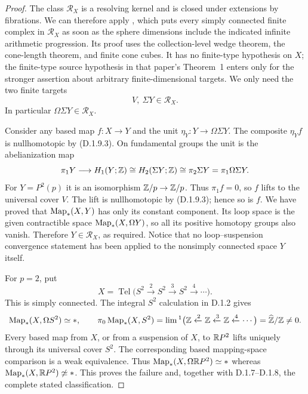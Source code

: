 \begin{proof}
The class $\mathcal R_X$ is a resolving kernel and is closed
under extensions by fibrations. We can therefore apply
\cite[Corollary~12(a), pp.~8--9]{I_Strom2012}, which puts every
simply connected finite complex in $\mathcal R_X$ as soon as
the sphere dimensions include the indicated infinite arithmetic
progression. Its proof uses the collection-level wedge theorem,
the cone-length theorem, and finite cone cubes. It has no
finite-type hypothesis on $X$; the finite-type source hypothesis
in that paper's Theorem~1 enters only for the stronger assertion
about arbitrary finite-dimensional targets. We only need the
two finite targets
\[
                           V,\ \Sigma Y\in\mathcal R_X.
 \tag{D.1.9.3}
\]
In particular $\Omega\Sigma Y\in\mathcal R_X$.

Consider any based map $f:X\to Y$ and the unit
$\eta_Y:Y\to\Omega\Sigma Y$. The composite $\eta_Yf$ is
nullhomotopic by (D.1.9.3). On fundamental groups the unit is
the abelianization map
\[
 \pi_1Y\longrightarrow H_1(Y;\mathbb Z)
     \cong H_2(\Sigma Y;\mathbb Z)
     \cong\pi_2\Sigma Y=\pi_1\Omega\Sigma Y.
\]
For $Y=P^2(p)$ it is an isomorphism $\mathbb Z/p\to\mathbb Z/p$.
Thus $\pi_1f=0$, so $f$ lifts to the universal cover $V$.
The lift is nullhomotopic by (D.1.9.3); hence so is $f$.
We have proved that $\operatorname{Map}_*(X,Y)$ has only its constant
component. Its loop space is the given contractible space
$\operatorname{Map}_*(X,\Omega Y)$, so all its positive homotopy groups
also vanish. Therefore $Y\in\mathcal R_X$, as required.
Notice that no loop--suspension convergence statement has been
applied to the nonsimply connected space $Y$ itself.

For $p=2$, put
\[
 X=\operatorname{Tel}\bigl(S^2\xrightarrow{2}S^2
              \xrightarrow{3}S^2\xrightarrow{4}\cdots\bigr).
\]
This is simply connected. The integral $S^2$ calculation in
D.1.2 gives
\[
 \operatorname{Map}_*(X,\Omega S^2)\simeq *,\qquad
 \pi_0\operatorname{Map}_*(X,S^2)
       =\lim{}^1\bigl(\mathbb Z\xleftarrow{2}\mathbb Z
                      \xleftarrow{3}\mathbb Z\xleftarrow{4}\cdots\bigr)
       =\widehat{\mathbb Z}/\mathbb Z\ne0.
\]
Every based map from $X$, or from a suspension of $X$, to
$\mathbb{R}P^2$ lifts uniquely through its universal cover $S^2$.
The corresponding based mapping-space comparison is a weak
equivalence. Thus
$\operatorname{Map}_*(X,\Omega\mathbb{R}P^2)\simeq *$ whereas
$\operatorname{Map}_*(X,\mathbb{R}P^2)\not\simeq *$. This proves the failure and,
together with D.1.7--D.1.8, the complete stated classification.
\end{proof}
